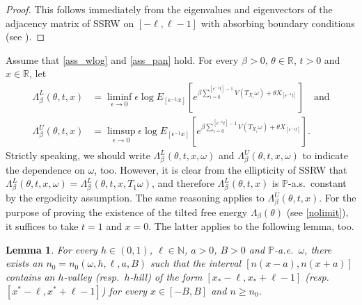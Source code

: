 \documentclass[a4paper]{amsart}
\numberwithin{equation}{section}
\theoremstyle{plain}
\newtheorem{lemma}[theorem]{\sc Lemma}
\theoremstyle{remark}
\begin{document}
\begin{proof}
	This follows immediately from the eigenvalues and eigenvectors of the adjacency matrix of SSRW on $[-\ell,\ell-1]$ with absorbing boundary conditions (see \cite[p.\ 239]{Spi1976}).
\end{proof}

Assume that \eqref{ass_wlog} and \eqref{ass_pan} hold. For every $\beta>0$, $\theta\in\mathbb{R}$, $t>0$ and $x\in\mathbb{R}$, let 
\begin{align}
\Lambda_\beta^L(\theta,t,x) &= \liminf_{{\epsilon}\to0}{\epsilon}\log E_{[{\epsilon^{-1}} x]}\left[e^{\beta\sum_{i=0}^{[{\epsilon^{-1}} t]-1}V(T_{X_i}\omega) + \theta X_{[{\epsilon^{-1}} t]}}\right]\quad \text{and}\label{kosk1}\\
\Lambda_\beta^U(\theta,t,x) &= \limsup_{{\epsilon}\to0}{\epsilon}\log E_{[{\epsilon^{-1}} x]}\left[e^{\beta\sum_{i=0}^{[{\epsilon^{-1}} t]-1}V(T_{X_i}\omega) + \theta X_{[{\epsilon^{-1}} t]}}\right].\label{kosk2}
\end{align}
Strictly speaking, we should write $\Lambda_\beta^L(\theta,t,x,\omega)$ and $\Lambda_\beta^U(\theta,t,x,\omega)$ to indicate the dependence on $\omega$, too. However, it is clear from the ellipticity of SSRW that $\Lambda_\beta^L(\theta,t,x,\omega) = \Lambda_\beta^L(\theta,t,x,T_1\omega)$, and therefore $\Lambda_\beta^L(\theta,t,x)$ is $\mathbb{P}$-a.s.\ constant by the ergodicity assumption. The same reasoning applies to $\Lambda_\beta^U(\theta,t,x)$. For the purpose of proving the existence of the tilted free energy $\Lambda_\beta(\theta)$ (see \eqref{nolimit}), it suffices to take $t=1$ and $x=0$. The latter applies to the following lemma, too.

\begin{lemma}\label{gayettehos}
For every $h\in(0,1)$, $\ell\in\mathbb{N}$, $a>0$, $B>0$ and $\mathbb{P}$-a.e.\ $\omega$, there exists an $n_0 = n_0(\omega,h,\ell,a,B)$ such that the interval $[n(x-a),n(x+a)]$ contains an $h$-valley (resp.\ $h$-hill) of the form $[x_*-\ell,x_*+\ell -1]$ (resp.\ $[x^*-\ell,x^*+\ell -1]$) for every $x\in[-B,B]$ and $n\ge n_0$.
\end{lemma}
\end{document}
